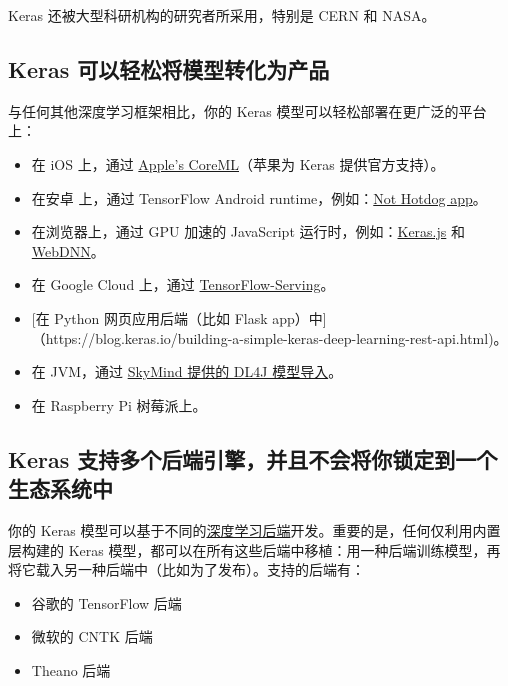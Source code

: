 Keras 还被大型科研机构的研究者所采用，特别是 CERN 和 NASA。


\subsection{Keras
可以轻松将模型转化为产品}\label{keras-ux53efux4ee5ux8f7bux677eux5c06ux6a21ux578bux8f6cux5316ux4e3aux4ea7ux54c1}

与任何其他深度学习框架相比，你的 Keras
模型可以轻松部署在更广泛的平台上：

\begin{itemize}
\tightlist
\item
  在 iOS 上，通过
  \href{https://developer.apple.com/documentation/coreml}{Apple's
  CoreML}（苹果为 Keras 提供官方支持）。
\item
  在安卓 上，通过 TensorFlow Android
  runtime，例如：\href{https://medium.com/@timanglade/how-hbos-silicon-valley-built-not-hotdog-with-mobile-tensorflow-keras-react-native-ef03260747f3}{Not
  Hotdog app}。
\item
  在浏览器上，通过 GPU 加速的 JavaScript
  运行时，例如：\href{https://transcranial.github.io/keras-js/\#/}{Keras.js}
  和 \href{https://mil-tokyo.github.io/webdnn/}{WebDNN}。
\item
  在 Google Cloud 上，通过
  \href{https://www.tensorflow.org/serving/}{TensorFlow-Serving}。
\item
  {[}在 Python 网页应用后端（比如 Flask
  app）中{]}（https://blog.keras.io/building-a-simple-keras-deep-learning-rest-api.html)。
\item
  在 JVM，通过
  \href{https://deeplearning4j.org/model-import-keras}{SkyMind 提供的
  DL4J 模型导入}。
\item
  在 Raspberry Pi 树莓派上。
\end{itemize}


\subsection{Keras
支持多个后端引擎，并且不会将你锁定到一个生态系统中}\label{keras-ux652fux6301ux591aux4e2aux540eux7aefux5f15ux64ceux5e76ux4e14ux4e0dux4f1aux5c06ux4f60ux9501ux5b9aux5230ux4e00ux4e2aux751fux6001ux7cfbux7edfux4e2d}

你的 Keras
模型可以基于不同的\hyperref[keras-backend]{深度学习后端}开发。重要的是，任何仅利用内置层构建的
Keras
模型，都可以在所有这些后端中移植：用一种后端训练模型，再将它载入另一种后端中（比如为了发布）。支持的后端有：

\begin{itemize}
\tightlist
\item
  谷歌的 TensorFlow 后端
\item
  微软的 CNTK 后端
\item
  Theano 后端
\end{itemize}

